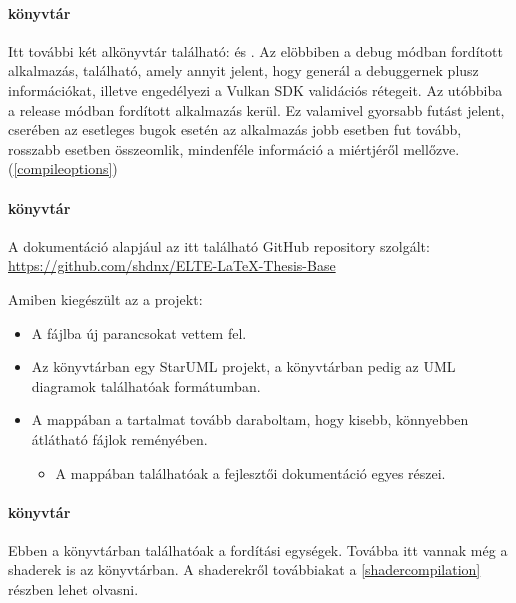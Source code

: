 \paragraph{ k\"onyvt\'ar}
Itt tov\'abbi k\'et alk\"onyvt\'ar tal\'alhat\'o:  \'es . Az el\"obbiben a debug m\'odban ford\'itott alkalmaz\'as, tal\'alhat\'o, amely annyit jelent, hogy gener\'al a  debuggernek plusz inform\'aci\'okat, illetve enged\'elyezi a Vulkan SDK valid\'aci\'os r\'etegeit.
Az ut\'obbiba a release m\'odban ford\'itott alkalmaz\'as ker\"ul. Ez valamivel gyorsabb fut\'ast jelent, cser\'eben az esetleges bugok eset\'en az alkalmaz\'as jobb esetben fut tov\'abb, rosszabb esetben \"osszeomlik, mindenf\'ele inform\'aci\'o a mi\'ertj\'er\H ol mell\H ozve.(\ref{compileoptions})

\paragraph{ k\"onyvt\'ar}
A dokument\'aci\'o alapj\'aul az itt tal\'alhat\'o GitHub repository szolg\'alt: \url{https://github.com/shdnx/ELTE-LaTeX-Thesis-Base}

Amiben kieg\'esz\"ult az a projekt:
\begin{itemize}
	\item A  f\'ajlba \'uj parancsokat vettem fel.
	\item Az  k\"onyvt\'arban egy StarUML projekt, a  k\"onyvt\'arban pedig az UML diagramok tal\'alhat\'oak  form\'atumban.
	\item A  mapp\'aban a tartalmat tov\'abb daraboltam, hogy kisebb, k\"onnyebben \'atl\'athat\'o f\'ajlok rem\'eny\'eben.
		\begin{itemize}
			\item A  mapp\'aban tal\'alhat\'oak a fejleszt\H oi dokument\'aci\'o egyes r\'eszei.
		\end{itemize}
\end{itemize}

\paragraph{ k\"onyvt\'ar}
Ebben a k\"onyvt\'arban tal\'alhat\'oak a ford\'it\'asi egys\'egek.
Tov\'abba itt vannak m\'eg a shaderek is az  k\"onyvt\'arban.
A shaderekr\H ol tov\'abbiakat a \ref{shadercompilation} r\'eszben lehet olvasni.

